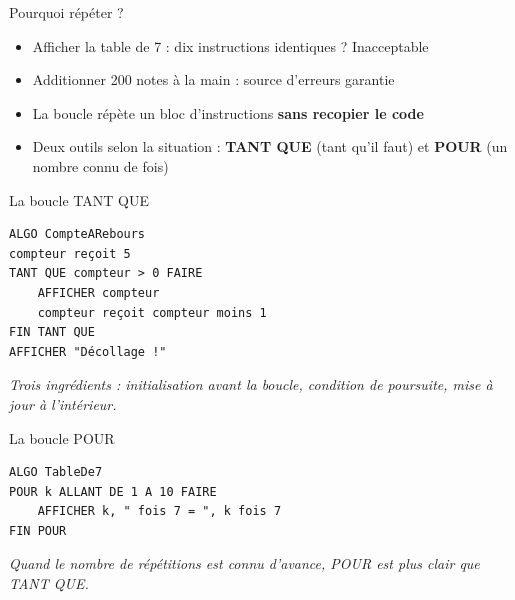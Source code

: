 \documentclass[aspectratio=169,11pt]{beamer}
\begin{document}
\begin{frame}{Pourquoi répéter ?}
\begin{itemize}
  \item Afficher la table de 7 : dix instructions identiques ? Inacceptable
  \item Additionner 200 notes à la main : source d'erreurs garantie
  \item La boucle répète un bloc d'instructions \textbf{sans recopier le code}
  \item Deux outils selon la situation : \textbf{TANT QUE} (tant qu'il faut) et \textbf{POUR} (un nombre connu de fois)
\end{itemize}
\end{frame}

\begin{frame}[fragile]{La boucle TANT QUE}

\begin{lstlisting}[style=py]
ALGO CompteARebours
compteur reçoit 5
TANT QUE compteur > 0 FAIRE
    AFFICHER compteur
    compteur reçoit compteur moins 1
FIN TANT QUE
AFFICHER "Décollage !"
\end{lstlisting}
\vspace{0.5pt}

{\small\color{PyGris}\itshape Trois ingrédients : initialisation avant la boucle, condition de poursuite, mise à jour à l'intérieur.}

\end{frame}

\begin{frame}[fragile]{La boucle POUR}

\begin{lstlisting}[style=py]
ALGO TableDe7
POUR k ALLANT DE 1 A 10 FAIRE
    AFFICHER k, " fois 7 = ", k fois 7
FIN POUR
\end{lstlisting}
\vspace{0.5pt}

{\small\color{PyGris}\itshape Quand le nombre de répétitions est connu d'avance, POUR est plus clair que TANT QUE.}

\end{frame}
\end{document}
